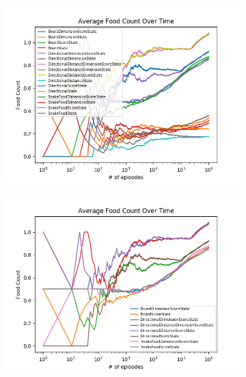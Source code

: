 \documentclass[result.tex]{subfiles}
\begin{document}
    \begin{figure}[ht]
        \centering
        \begin{subfigure}[b]{.35\linewidth}
            \includegraphics[width=\linewidth]{../images/sarsa/state/234/all_average_food_count_over_time.png}
        \end{subfigure}
        \begin{subfigure}[b]{.35\linewidth}
            \includegraphics[width=\linewidth]{../images/sarsa/state/234/score_dim_average_food_count_over_time.png}
        \end{subfigure}


\end{figure}
\end{document}
